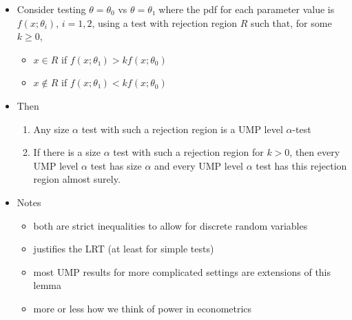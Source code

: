 \begin{itemize}
\item Consider testing $θ = θ_0$ vs $θ = θ₁$ where the pdf for each
  parameter value is $f(x; θ_i)$, $i = 1,2$, using a test with
  rejection region $R$ such that, for some $k ≥ 0$,
\begin{itemize}
\item $x ∈ R$ if $f(x; θ₁) > k f(x; θ_0)$
\item $x ∉ R$ if $f(x; θ₁) < k f(x; θ_0)$
\end{itemize}
\item Then
\begin{enumerate}
\item Any size $α$ test with such a rejection region is a UMP level $α$-test
\item If there is a size $α$ test with such a rejection region for $k
  > 0$, then every UMP level $α$ test has size $α$ and every UMP level
  $α$ test has this rejection region almost surely.
\end{enumerate}
\item Notes
\begin{itemize}
\item both are strict inequalities to allow for discrete random
         variables
\item justifies the LRT (at least for simple tests)
\item most UMP results for more complicated settings are extensions
         of this lemma
\item more or less how we think of power in econometrics
\end{itemize}
\end{itemize}

